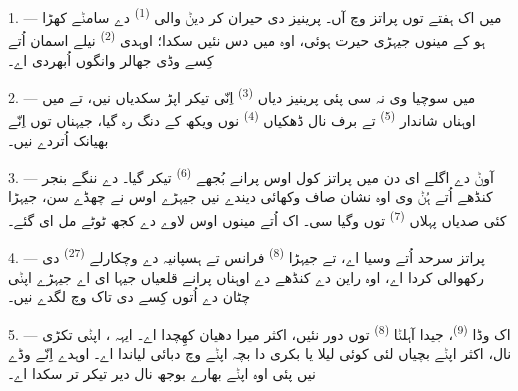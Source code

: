 
\VUsaut{4.0mm}
\VUsaut{3.0mm}

\VUsaut{3.0mm}

\VUsaut{3.0mm}

1. --- میں اک ہفتے توں پراتز وچ آں۔ پرینیز دی حیران کر دیݨ والی
 \textsuperscript{(1)} دے سامݨے کھڑا ہو کے مینوں جیہڑی حیرت
ہوئی، اوہ میں دس نئیں سکدا؛ اوہدی  \textsuperscript{(2)}
نیلے اسمان اُتے کِسے وڈی جھالر وانگوں اُبھردی اے۔

2. --- میں سوچیا وی نہ سی پئی پرینیز دیاں  \textsuperscript{(3)}
اِنّی  تیکر اپڑ سکدیاں نیں، تے میں اوہناں شاندار
 \textsuperscript{(5)} تے برف نال ڈھکیاں 
\textsuperscript{(4)} نوں ویکھ کے دنگ رہ گیا، جیہناں توں اِنّے بھیانک
 اُتردے نیں۔

\VUsaut{3.0mm}
\VUsaut{3.0mm}

3. --- آوݨ دے اگلے ای دن میں پراتز کول اوس پرانے بُجھے 
\textsuperscript{(6)} تیکر گیا۔  دے ننگے بنجر کنڈھے اُتے ہُݨ وی اوہ
نشان صاف وکھائی دیندے نیں جیہڑے اوس  نے چھڈے سن، جیہڑا کئی صدیاں
پہلاں  \textsuperscript{(7)} توں وگیا سی۔ اک
 اُتے مینوں اوس لاوے دے کجھ ٹوٹے مل ای گئے۔

4. --- پراتز سرحد اُتے وسیا اے، تے جیہڑا  \textsuperscript{(8)} فرانس
تے ہسپانیہ دے وچکارلے  \textsuperscript{(27)} دی رکھوالی کردا اے، اوہ
راین دے کنڈھے دے اوہناں پرانے قلعیاں جیہا ای اے جیہڑے اپݨی چٹان دے اُتوں کِسے
 دی تاک وچ لگدے نیں۔

5. --- اک وڈا  \textsuperscript{(9)}، جیدا آہلݨا 
\textsuperscript{(8)} توں دور نئیں، اکثر میرا دھیان کھِچدا اے۔ ایہہ
، اپݨی تکڑی  نال، اکثر اپݨے بچیاں لئی کوئی لیلا
یا بکری دا بچہ اپݨے  وچ دبائی لیاندا اے۔ اوہدے  اِنّے
وڈے نیں پئی اوہ اپݨے بھارے بوجھ نال دیر تیکر تر سکدا اے۔

